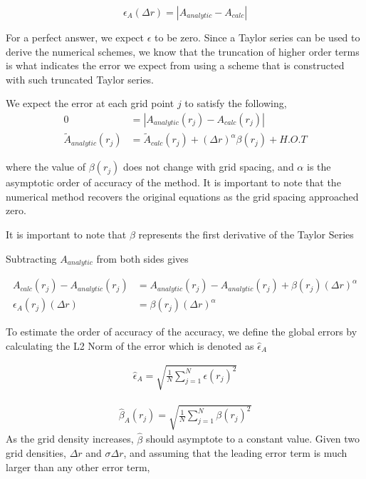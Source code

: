 \documentclass[12pt]{article}
\begin{document}
\[ \epsilon_{A}(\Delta r) = |A_{analytic}-A_{calc}|\]

For a perfect answer, we expect $\epsilon$ to be zero. Since a Taylor series can 
be used to derive the numerical schemes, we know that the truncation of higher
order terms is what indicates the error we expect from using a scheme that 
is constructed with such truncated Taylor series.

We expect the error at each grid point $j$ to satisfy the following,
\begin{align*}
    0 &= |A_{analytic}(r_j) - A_{calc}(r_j)| \\
    \widetilde{A}_{analytic}(r_j) &= \widetilde{A}_{calc}(r_j) +
    (\Delta r)^{\alpha} \beta(r_j)  + H.O.T
\end{align*}

where the value of $\beta(r_j)$ does not change with grid spacing, and 
$\alpha$ is the asymptotic order of accuracy of the method. It is important to
note that the numerical method recovers the original equations as the grid 
spacing approached zero. 

It is important to note that $\beta$ represents the first derivative of the 
Taylor Series

Subtracting $A_{analytic}$ from both sides gives

\begin{align*}
    A_{calc}(r_j) - A_{analytic}(r_j) &= A_{analytic}(r_j) - A_{analytic}(r_j)
    + \beta(r_j) (\Delta r)^{\alpha} \\
    \epsilon_A(r_j)(\Delta r) &= \beta(r_j) (\Delta r)^{\alpha}
\end{align*}

To estimate the order of accuracy of the accuracy, we define the global errors 
by calculating the L2 Norm of the error which is denoted as $\hat{\epsilon}_A$ 


\begin{align*}
    \hat{\epsilon}_A = \sqrt{\frac{1}{N}\sum_{j=1}^{N} \epsilon(r_j)^2  }
\end{align*}

\begin{align*}
    \hat{\beta}_A(r_j) = \sqrt{\frac{1}{N}\sum_{j=1}^{N} \beta(r_j)^2  }
\end{align*}
As the grid density increases, $\hat{\beta}$ should asymptote to a constant 
value. Given two grid densities, $\Delta r$ and $\sigma\Delta r$, and assuming
that the leading error term is much larger than any other error term,
\end{document}
